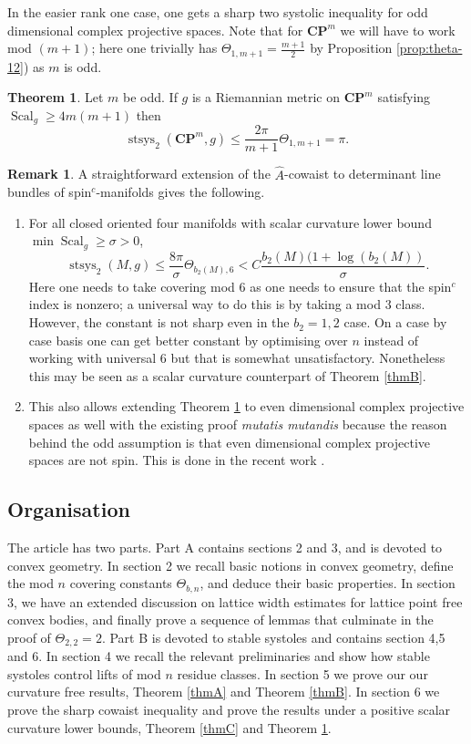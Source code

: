 \documentclass[11pt,reqno]{amsart}
\numberwithin{equation}{section}
\numberwithin{equation}{section}
\theoremstyle{definition}
\newtheorem{remark}[theorem]{Remark}
\newtheorem{theorema}{Theorem}
\newcommand{\CP}{\mathbf{CP}}
\DeclareMathOperator{\Scal}{Scal}
\DeclareMathOperator{\stsys}{stsys}
\newcommand{\Ah}{\widehat A}
\begin{document}
In the easier rank one case, one gets a sharp two systolic inequality for odd dimensional complex projective spaces. Note that for $\CP^m$ we will have to work mod $(m+1)$; here one trivially has $\Theta_{1,m+1} = \frac{m+1}{2}$ by Proposition \ref{prop:theta-12}) as $m$ is odd.
\begin{theorema}\label{thmD}
Let $m$ be odd. If $g$ is a Riemannian metric on $\CP^m$ satisfying \(\Scal_g\ge4m(m+1)\) then 
\[   \stsys_2(\CP^m,g)\le \frac{2\pi}{m+1} \Theta_{1,m+1} =  \pi. \]
\end{theorema}
\begin{remark}
   A straightforward extension of the $\Ah$-cowaist to determinant line bundles of spin$^c$-manifolds gives the following.
   \begin{enumerate}
       \item  For all closed oriented four manifolds with scalar curvature lower bound $\min \Scal_g \geq \sigma > 0$, \[\stsys_2(M,g) \leq \frac{8\pi}{\sigma} \Theta_{b_2(M),6} <C\frac{b_2(M)(1+\log(b_2(M))}{\sigma}.\]
Here one needs to take covering mod 6 as one needs to ensure that the spin$^c$ index is nonzero; a universal way to do this is by taking a mod $3$ class. However, the constant is not sharp even in the $b_2=1,2$ case. On a case by case basis one can get better constant by optimising over $n$ instead of working with universal $6$ but that is somewhat unsatisfactory. Nonetheless this may be seen as a scalar curvature counterpart of Theorem \ref{thmB}.
\item  This also allows extending Theorem \ref{thmD} to even dimensional complex projective spaces as well with the existing proof \textit{mutatis mutandis} because the reason behind the odd assumption is that even dimensional complex projective spaces are not spin. This is done in the recent work \cite{CHZ}.

   \end{enumerate} 
\end{remark}

\subsection{Organisation} The article has two parts. Part A contains sections 2 and 3, and is devoted to convex geometry. In section 2 we recall basic notions in convex geometry, define the mod $n$ covering constants $\Theta_{b,n}$,  and deduce their basic properties.  In section 3, we have an extended discussion on lattice width estimates for lattice point free convex bodies, and finally prove a sequence of lemmas that culminate in the proof of $\Theta_{2,2}=2$. Part B is devoted to stable systoles and contains section 4,5 and 6. In section 4 we recall the relevant preliminaries and show how stable systoles control lifts of mod $n$ residue classes. In section 5 we prove our our curvature free results, Theorem \ref{thmA} and Theorem \ref{thmB}. In section 6 we prove the sharp cowaist inequality and prove the results under a positive scalar curvature lower bounds, Theorem \ref{thmC} and Theorem \ref{thmD}.  
\end{document}

